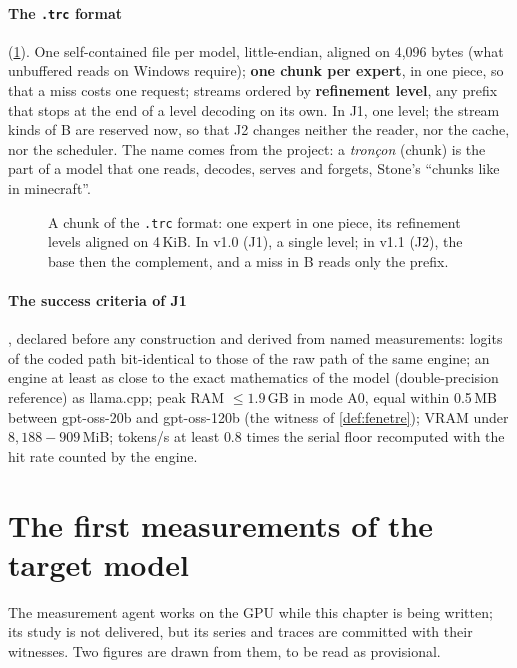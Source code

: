 \paragraph{The \texttt{.trc} format} (\cref{fig:troncon}). One self-contained file per model, little-endian, aligned on 4{,}096 bytes (what unbuffered reads on Windows require); \textbf{one chunk per expert}, in one piece, so that a miss costs one request; streams ordered by \textbf{refinement level}, any prefix that stops at the end of a level decoding on its own. In J1, one level; the stream kinds of B are reserved now, so that J2 changes neither the reader, nor the cache, nor the scheduler. The name comes from the project: a \emph{tronçon} (chunk) is the part of a model that one reads, decodes, serves and forgets, Stone's ``chunks like in minecraft''.

\begin{figure}[ht]
\centering
\SchemaTroncon
\caption[A chunk of the .trc format]{A chunk of the \texttt{.trc} format: one expert in one piece, its refinement levels aligned on 4\,KiB. In v1.0 (J1), a single level; in v1.1 (J2), the base then the complement, and a miss in B reads only the prefix.}
\label{fig:troncon}
\end{figure}

\paragraph{The success criteria of J1}, declared before any construction and derived from named measurements: logits of the coded path bit-identical to those of the raw path of the same engine; an engine at least as close to the exact mathematics of the model (double-precision reference) as llama.cpp; peak RAM $\le 1.9$\,GB in mode A0, equal within 0.5\,MB between gpt-oss-20b and gpt-oss-120b (the witness of \cref{def:fenetre}); VRAM under $8{,}188 - 909$\,MiB; tokens/s at least $0.8$ times the serial floor recomputed with the hit rate counted by the engine.

\section{The first measurements of the target model}\label{sec:premieres-mesures}

The measurement agent works on the GPU while this chapter is being written; its study is not delivered, but its series and traces are committed with their witnesses. Two figures are drawn from them, to be read as provisional.

